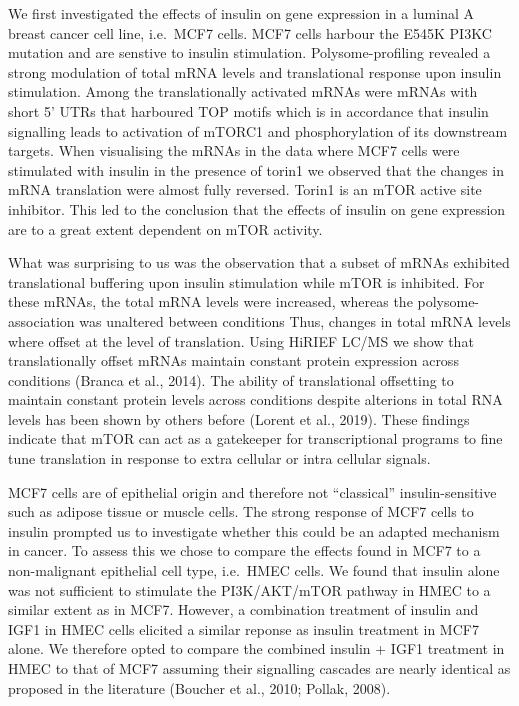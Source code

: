 \documentclass[12pt,openany]{book}
\begin{document}
We first investigated the effects of insulin on gene expression in a
luminal A breast cancer cell line, i.e.~MCF7 cells. MCF7 cells harbour
the E545K PI3KC mutation and are senstive to insulin stimulation.
Polysome-profiling revealed a strong modulation of total mRNA levels and
translational response upon insulin stimulation. Among the
translationally activated mRNAs were mRNAs with short 5' UTRs that
harboured TOP motifs which is in accordance that insulin signalling
leads to activation of mTORC1 and phosphorylation of its downstream
targets. When visualising the mRNAs in the data where MCF7 cells were
stimulated with insulin in the presence of torin1 we observed that the
changes in mRNA translation were almost fully reversed. Torin1 is an
mTOR active site inhibitor. This led to the conclusion that the effects
of insulin on gene expression are to a great extent dependent on mTOR
activity.

What was surprising to us was the observation that a subset of mRNAs
exhibited translational buffering upon insulin stimulation while mTOR is
inhibited. For these mRNAs, the total mRNA levels were increased,
whereas the polysome-association was unaltered between conditions Thus,
changes in total mRNA levels where offset at the level of translation.
Using HiRIEF LC/MS we show that translationally offset mRNAs maintain
constant protein expression across conditions (Branca et al., 2014). The
ability of translational offsetting to maintain constant protein levels
across conditions despite alterions in total RNA levels has been shown
by others before (Lorent et al., 2019). These findings indicate that
mTOR can act as a gatekeeper for transcriptional programs to fine tune
translation in response to extra cellular or intra cellular signals.

MCF7 cells are of epithelial origin and therefore not ``classical''
insulin-sensitive such as adipose tissue or muscle cells. The strong
response of MCF7 cells to insulin prompted us to investigate whether
this could be an adapted mechanism in cancer. To assess this we chose to
compare the effects found in MCF7 to a non-malignant epithelial cell
type, i.e.~HMEC cells. We found that insulin alone was not sufficient to
stimulate the PI3K/AKT/mTOR pathway in HMEC to a similar extent as in
MCF7. However, a combination treatment of insulin and IGF1 in HMEC cells
elicited a similar reponse as insulin treatment in MCF7 alone. We
therefore opted to compare the combined insulin + IGF1 treatment in HMEC
to that of MCF7 assuming their signalling cascades are nearly identical
as proposed in the literature (Boucher et al., 2010; Pollak, 2008).
\end{document}
